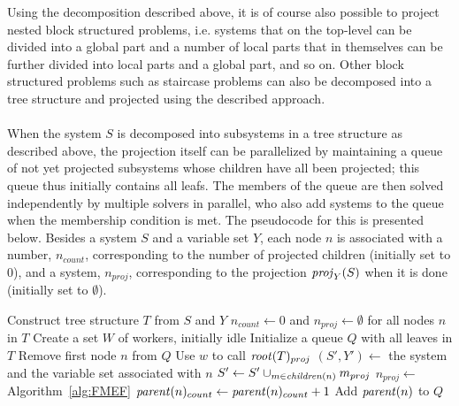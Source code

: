 \noindent Using the decomposition described above, it is of course also possible to project nested block structured problems, i.e. systems that on the top-level can be divided into a global part and a number of local parts that in themselves can be further divided into local parts and a global part, and so on.  
Other block structured problems such as staircase problems can also be decomposed into a tree structure and projected using the described approach. 
\\\\
When the system $S$ is decomposed into subsystems in a tree structure as described above, the projection itself can be parallelized by maintaining a queue of not yet projected subsystems whose children have all been projected; this queue thus initially contains all leafs. 
The members of the queue are then solved independently by multiple solvers in parallel, who also add systems to the queue when the membership condition is met.
The pseudocode for this is presented below. Besides a system $S$ and a variable set $Y$, each node $n$ is associated with a number, $n_{count}$, corresponding to the number of projected children (initially set to $0$), and a system, $n_{proj}$, corresponding to the projection $\mathit{proj}_Y(S)$ when it is done (initially set to $\emptyset$). 
\vspace{1mm}

\begin{algorithmic}
	\State Construct  tree structure $T$ from $S$ and $Y$
	\State $n_{count}\gets 0$ and $n_{proj}\gets\emptyset$ for all nodes $n$ in $T$
	\State Create a set $W$ of workers, initially idle
	\State Initialize a queue $Q$ with all leaves in $T$
			\State Remove first node $n$ from $Q$
			\State Use $w$ to call 
		\EndIf
	\EndWhile
	\State \Return $\mathit{root}(T)_{proj}$
\EndFunction
\Statex
{}
	\State $(S',Y')\gets$ the system and the variable set associated with $n$
	\State $S'\gets S'\cup_{m\in \mathit{children}(n)} m_{proj}$ 
	\State $n_{proj}\gets$  \Comment Algorithm~\ref{alg:FMEF}
	\State $\mathit{parent}(n)_{count} \gets \mathit{parent}(n)_{count} +1$
		\State Add $\mathit{parent}(n)$ to $Q$
	\EndIf
	\State \Return
\EndFunction
\end{algorithmic}	

